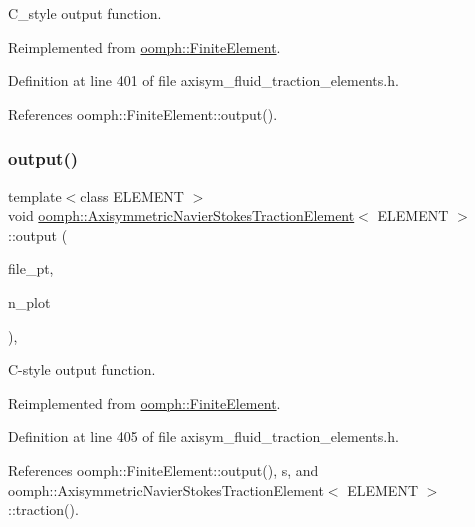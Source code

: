 C\+\_\+style output function. 



Reimplemented from \hyperlink{classoomph_1_1FiniteElement_a72cddd09f8ddbee1a20a1ff404c6943e}{oomph\+::\+Finite\+Element}.



Definition at line 401 of file axisym\+\_\+fluid\+\_\+traction\+\_\+elements.\+h.



References oomph\+::\+Finite\+Element\+::output().

\mbox{\label{classoomph_1_1AxisymmetricNavierStokesTractionElement_a19e8ff226642b931a736c7b6184b826c}} 
\subsubsection{\texorpdfstring{output()}{output()}\hspace{0.1cm}{\footnotesize\ttfamily [4/4]}}
{\footnotesize\ttfamily template$<$class E\+L\+E\+M\+E\+NT $>$ \\
void \hyperlink{classoomph_1_1AxisymmetricNavierStokesTractionElement}{oomph\+::\+Axisymmetric\+Navier\+Stokes\+Traction\+Element}$<$ E\+L\+E\+M\+E\+NT $>$\+::output (\begin{DoxyParamCaption}\item[{F\+I\+LE $\ast$}]{file\+\_\+pt,  }\item[{const unsigned \&}]{n\+\_\+plot }\end{DoxyParamCaption})\hspace{0.3cm}{\ttfamily [inline]}, {\ttfamily [virtual]}}



C-\/style output function. 



Reimplemented from \hyperlink{classoomph_1_1FiniteElement_adfaee690bb0608f03320eeb9d110d48c}{oomph\+::\+Finite\+Element}.



Definition at line 405 of file axisym\+\_\+fluid\+\_\+traction\+\_\+elements.\+h.



References oomph\+::\+Finite\+Element\+::output(), s, and oomph\+::\+Axisymmetric\+Navier\+Stokes\+Traction\+Element$<$ E\+L\+E\+M\+E\+N\+T $>$\+::traction().

